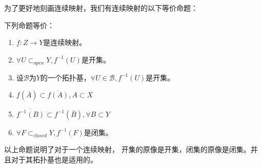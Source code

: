 \documentclass[lang=cn,10pt,device=pad]{elegantbook}
\newcommand{\tpj}{\mathcal{B}}
\begin{document}
为了更好地刻画连续映射，我们有连续映射的以下等价命题：
\begin{proposition}下列命题等价：
	\begin{enumerate}
		\item $f:Z\longrightarrow Y$是连续映射。
		\item $\forall U\subset_{open} Y,f^{-1}(U)$是开集。
		\item 设$\tpj$为$Y$的一个拓扑基，$\forall U\in \tpj,f^{-1}(U)$是开集。
		\item $f(\overline{A}) \subset \overline{f(A)} ,A\subset X$
		\item $\overline{f^{-1}(B)}\subset f^{-1}(\overline{B}),\forall B\subset Y$
		\item $\forall F\subset_{closed}Y,f^{-1}(F)$是闭集。
	\end{enumerate}
\end{proposition}
\begin{note}
以上命题说明了对于一个连续映射，	开集的原像是开集，闭集的原像是闭集。并且对于其拓扑基也是适用的。
\end{note}
\end{document}
